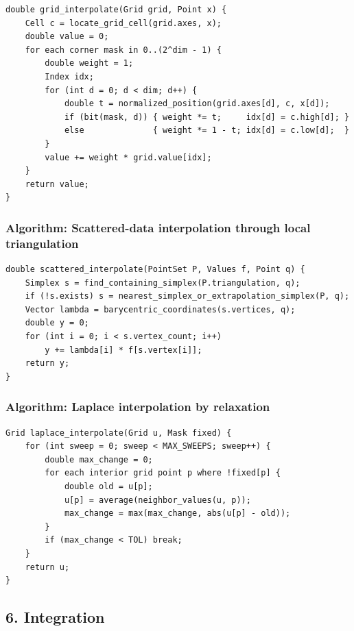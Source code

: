 \documentclass[11pt]{article}
\begin{document}
\begin{verbatim}
double grid_interpolate(Grid grid, Point x) {
    Cell c = locate_grid_cell(grid.axes, x);
    double value = 0;
    for each corner mask in 0..(2^dim - 1) {
        double weight = 1;
        Index idx;
        for (int d = 0; d < dim; d++) {
            double t = normalized_position(grid.axes[d], c, x[d]);
            if (bit(mask, d)) { weight *= t;     idx[d] = c.high[d]; }
            else              { weight *= 1 - t; idx[d] = c.low[d];  }
        }
        value += weight * grid.value[idx];
    }
    return value;
}
\end{verbatim}

\subsubsection{Algorithm: Scattered-data interpolation through local triangulation}\label{algorithm-scattered-data-interpolation-through-local-triangulation}

\begin{verbatim}
double scattered_interpolate(PointSet P, Values f, Point q) {
    Simplex s = find_containing_simplex(P.triangulation, q);
    if (!s.exists) s = nearest_simplex_or_extrapolation_simplex(P, q);
    Vector lambda = barycentric_coordinates(s.vertices, q);
    double y = 0;
    for (int i = 0; i < s.vertex_count; i++)
        y += lambda[i] * f[s.vertex[i]];
    return y;
}
\end{verbatim}

\subsubsection{Algorithm: Laplace interpolation by relaxation}\label{algorithm-laplace-interpolation-by-relaxation}

\begin{verbatim}
Grid laplace_interpolate(Grid u, Mask fixed) {
    for (int sweep = 0; sweep < MAX_SWEEPS; sweep++) {
        double max_change = 0;
        for each interior grid point p where !fixed[p] {
            double old = u[p];
            u[p] = average(neighbor_values(u, p));
            max_change = max(max_change, abs(u[p] - old));
        }
        if (max_change < TOL) break;
    }
    return u;
}
\end{verbatim}

\subsection{6. Integration}\label{integration}
\end{document}
